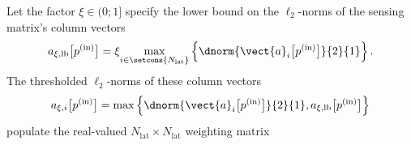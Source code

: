 Let
the factor
$\xi \in ( 0; 1 ]$ specify
the lower bound on
the $\ell_{2}$-norms of
the sensing matrix's column vectors
\begin{equation}
  a_{\xi, \text{lb}}\bigl[ p^{(\text{in})} \bigr]
  =
  \xi
  \underset{ i \in \setcons{ N_{\text{lat}} } }{ \max }
  \left\{
    \dnorm{ \vect{a}_{i}\bigl[ p^{(\text{in})} \bigr] }{2}{1}
  \right\}.
 \label{eqn:recovery_reg_norm_l2_norms_lb}
\end{equation}
The thresholded $\ell_{2}$-norms of
these column vectors
\begin{equation}
  a_{ \xi, i }\bigl[ p^{(\text{in})} \bigr]
  =
  \max
  \left\{
    \dnorm{ \vect{a}_{i}\bigl[ p^{(\text{in})} \bigr] }{2}{1},
    a_{\xi, \text{lb}}\bigl[ p^{(\text{in})} \bigr]
  \right\}
 \label{eqn:recovery_reg_norm_l2_norms_thresholded}
\end{equation}
populate
the real-valued
$N_{\text{lat}} \times N_{\text{lat}}$ weighting matrix
